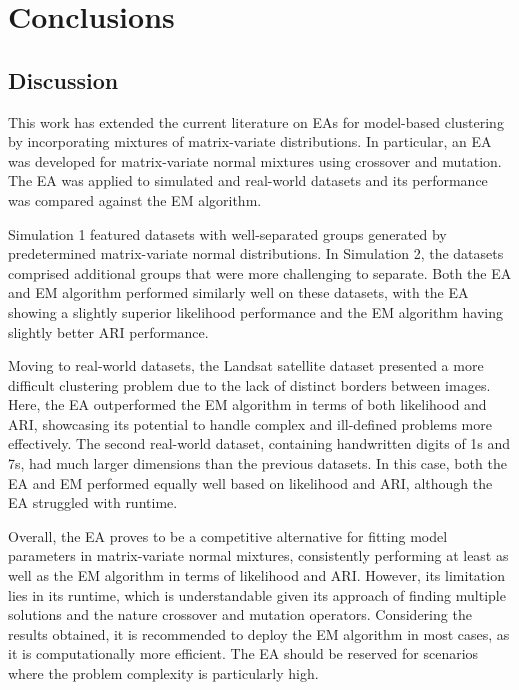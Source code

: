 \documentclass[12pt]{report}
\begin{document}
\chapter{Conclusions}




\section{Discussion}
This work has extended the current literature on EAs for model-based clustering by incorporating mixtures of matrix-variate distributions. In particular, an EA was developed for matrix-variate normal mixtures using crossover and mutation. The EA was applied to simulated and real-world datasets and its performance was compared against the EM algorithm. 

Simulation 1 featured datasets with well-separated groups generated by predetermined matrix-variate normal distributions. In Simulation 2, the datasets comprised additional groups that were more challenging to separate. Both the EA and EM algorithm performed similarly well on these datasets, with the EA showing a slightly superior likelihood performance and the EM algorithm having slightly better ARI performance.

Moving to real-world datasets, the Landsat satellite dataset presented a more difficult clustering problem due to the lack of distinct borders between images. Here, the EA outperformed the EM algorithm in terms of both likelihood and ARI, showcasing its potential to handle complex and ill-defined problems more effectively. The second real-world dataset, containing handwritten digits of 1s and 7s, had much larger dimensions than the previous datasets. In this case, both the EA and EM performed equally well based on likelihood and ARI, although the EA struggled with runtime. 

Overall, the EA proves to be a competitive alternative for fitting model parameters in matrix-variate normal mixtures, consistently performing at least as well as the EM algorithm in terms of likelihood and ARI. However, its limitation lies in its runtime, which is understandable given its approach of finding multiple solutions and the nature crossover and mutation operators. Considering the results obtained, it is recommended to deploy the EM algorithm in most cases, as it is computationally more efficient. The EA should be reserved for scenarios where the problem complexity is particularly high.
\end{document}
